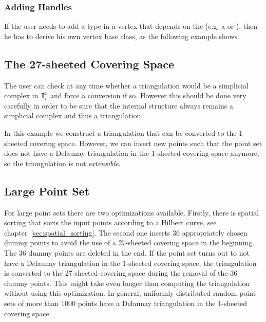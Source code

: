 
\subsubsection{Adding Handles}
If the user needs to add a type in a vertex that depends on the
 (e.g. a  or
), then he has to derive his own vertex base class,
as the following example shows.


\subsection{The 27-sheeted Covering Space}
The user can check at any time whether a triangulation would be a
simplicial complex in $\mathbb T_c^3$ and force a conversion if
so. However this should be done very carefully in order to be sure
that the internal structure always remains a simplicial complex and
thus a triangulation.

In this example we construct a triangulation that can be converted to
the 1-sheeted covering space. However, we can insert new points such that the
point set does not have a Delaunay triangulation in the 1-sheeted
covering space anymore, so the triangulation is not \emph{extensible}.



\subsection{Large Point Set}

For large point sets there are two optimizations available. Firstly,
there is spatial sorting that sorts the input points according to a
Hilbert curve, see chapter~\ref{sec:spatial_sorting}.
The second one inserts 36 appropriately chosen dummy points to avoid
the use of a 27-sheeted covering space in the beginning. The 36 dummy
points are deleted in the end. If the point set turns out to not have
a Delaunay triangulation in the 1-sheeted covering space, the triangulation is
converted to the 27-sheeted covering space during the removal of the 36 dummy
points. This might take even longer than computing the triangulation
without using this optimization. In general, uniformly distributed
random point sets of more than 1000 points have a Delaunay
triangulation in the 1-sheeted covering space.

